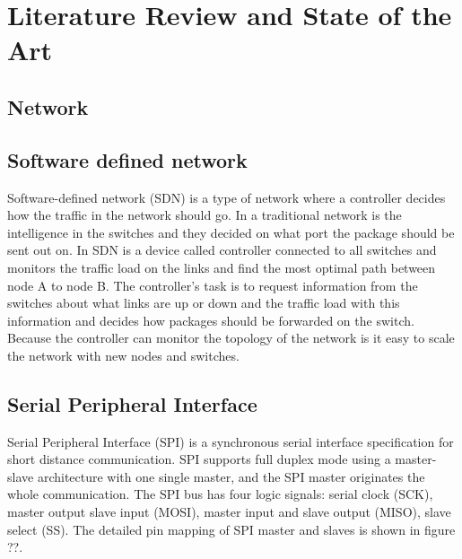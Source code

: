 \documentclass[11pt, titlepage]{article} %
\begin{document}
\section{Literature Review and State of the Art}

\subsection{Network}
\subsection{Software defined network}
Software-defined network (SDN) is a type of network where a controller decides how the traffic in the network should go. In a traditional network is the intelligence in the switches and they decided on what port the package should be sent out on. In SDN is a device called controller connected to all switches and monitors the traffic load on the links and find the most optimal path between node A to node B. The controller’s task is to request information from the switches about what links are up or down and the traffic load with this information and decides how packages should be forwarded on the switch. Because the controller can monitor the topology of the network is it easy to scale the network with new nodes and switches\cite{doi:10.1002/sec.1737}. 


\subsection{Serial Peripheral Interface}
Serial Peripheral Interface (SPI) is a synchronous serial interface specification for short distance communication. SPI supports full duplex mode using a master-slave architecture with one single master, and the SPI master originates the whole communication. The SPI bus has four logic signals: serial clock (SCK), master output slave input (MOSI), master input and slave output (MISO), slave select (SS). The detailed pin mapping of SPI master and slaves is shown in figure ??.
\end{document}
